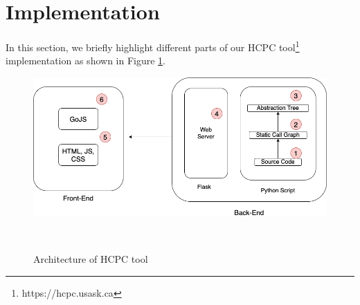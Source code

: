 \section{Implementation }
\label{hla3:implementation}
In this section, we briefly highlight different parts of our HCPC tool\footnote{https://hcpc.usask.ca} implementation as shown in Figure \ref{fig:architecture}.

  \begin{figure}[h]
    \centering
    \includegraphics[width=\columnwidth]{figures/hla3/hla3_implementation.png}
    \caption{Architecture of HCPC tool }~\label{fig:architecture}
    \end{figure}

